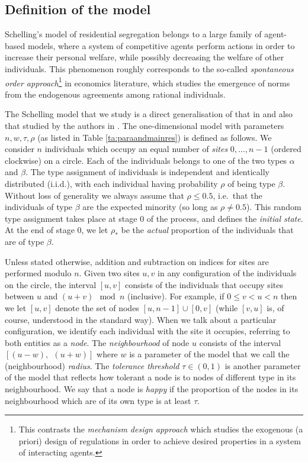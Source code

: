 \documentclass[11pt]{article}
\theoremstyle{plain}
\numberwithin{equation}{subsection}
\begin{document}
\subsection{Definition of the model}\label{def:modseg}
Schelling's model of residential segregation belongs to a large family of agent-based models, where
a system of 
competitive agents perform actions in order to increase their personal welfare, while possibly
decreasing the welfare of
other individuals.
This phenomenon roughly corresponds to the so-called {\em spontaneous order 
approach}\footnote{This contrasts the  {\em mechanism design approach} 
which studies the exogenous (a priori) design 
of regulations in order to achieve desired properties in a system of interacting agents.}
in economics literature, which studies the emergence of norms from the endogenous agreements among rational individuals. 


The Schelling model that we study is a direct generalisation of that in
\cite{brandt:an} and also that studied by the authors in  \cite{BELschel13}.  
The one-dimensional  model with parameters
$n, w, \tau, \rho$ (as listed in 
Table \ref{ta:paraandmainres}) is defined as follows.
We consider $n$ 
individuals which occupy an equal number of {\em sites} $0,\dots, n-1$ 
(ordered clockwise) on a circle.  Each of the individuals belongs to one of the
two types $\alpha$ and $\beta$. 
The  type assignment of individuals is independent and identically distributed (i.i.d.), with each individual having probability $\rho$
of being type $\beta$. Without loss of generality  
we always assume that $\rho\leq 0.5$, i.e.\ that the individuals of
type $\beta$ are the expected minority (so long as $\rho\neq 0.5$).
This random type assignment takes place at stage 0 of the process, and defines the \emph{initial state}. At the end of stage 0,  we let
$\rho_{\ast}$ be the {\em actual} proportion of the individuals that are of type
$\beta$. 


Unless stated otherwise, addition and subtraction on indices for sites are performed modulo $n$. Given two sites $u, v$ in any configuration of the individuals on the circle, 
the interval $[u, v]$ consists of the individuals that occupy sites
between $u$ and $(u+v)\mod n$ (inclusive). For example, if  $0\leq v<u<n$ then 
we let $[u,v]$ denote the set of nodes  $[u,n-1] \cup [0,v]$ 
(while $[v,u]$ is, of course, understood in the standard way).
 When we talk about a particular configuration, we identify each individual
with the site it occupies, referring to both entities as a {\em node}.
The {\em neighbourhood} of node $u$ consists 
of the interval $[(u-w),\ \ (u+w)]$
where $w$ is a parameter of the model
that we call the (neighbourhood) {\em radius}. 
The {\em tolerance threshold}  $\tau\in (0,1)$ is another parameter of the model 
that reflects how tolerant a node is to nodes of different type in its
neighbourhood.
We say that a node is {\em happy} if the proportion of the nodes 
 in its neighbourhood which are of its own type is at least $\tau$.
\end{document}
